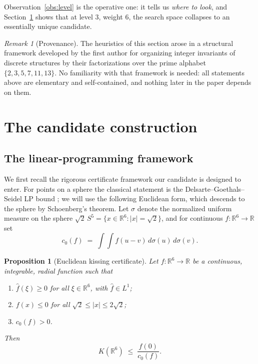 \documentclass[11pt,reqno]{amsart}
\theoremstyle{plain}
\newtheorem{proposition}[theorem]{Proposition}
\theoremstyle{definition}
\theoremstyle{remark}
\newtheorem{remark}[theorem]{Remark}
\newcommand{\R}{\mathbb{R}}
\newcommand{\fhat}[1]{\widehat{#1}}
\begin{document}
Observation~\ref{obs:level} is the operative one: it tells us
\emph{where to look}, and Section~\ref{sec:candidate} shows that at
level $3$, weight $6$, the search space collapses to an essentially
unique candidate.

\begin{remark}[Provenance]\label{rem:provenance}
The heuristics of this section arose in a structural framework
developed by the first author for organizing integer invariants of
discrete structures by their factorizations over the prime alphabet
$\{2,3,5,7,11,13\}$.  No familiarity with that framework is needed:
all statements above are elementary and self-contained, and nothing
later in the paper depends on them.
\end{remark}

\section{The candidate construction}\label{sec:candidate}

\subsection{The linear-programming framework}\label{subsec:LP}

We first recall the rigorous certificate framework our candidate is
designed to enter.  For points on a sphere the classical statement is
the Delsarte--Goethals--Seidel LP bound \cite{DGS1977,KabatianskyLevenshtein1978};
we will use the following Euclidean form, which descends to the sphere
by Schoenberg's theorem.  Let $\sigma$ denote the normalized uniform
measure on the sphere $\sqrt2\,S^5=\{x\in\R^6:|x|=\sqrt2\}$, and for
continuous $f:\R^6\to\R$ set
\[
c_0(f)\;=\;\int\!\!\int f(u-v)\,d\sigma(u)\,d\sigma(v).
\]

\begin{proposition}[Euclidean kissing certificate]\label{prop:certificate}
Let $f:\R^6\to\R$ be a continuous, integrable, radial function such
that
\begin{enumerate}
\item[(i)] $\fhat{f}(\xi)\ge0$ for all $\xi\in\R^6$, with
$\fhat f\in L^1$;
\item[(ii)] $f(x)\le0$ for all $\sqrt2\le|x|\le2\sqrt2$;
\item[(iii)] $c_0(f)>0$.
\end{enumerate}
Then
\[
K(\R^6)\;\le\;\frac{f(0)}{c_0(f)} .
\]
\end{proposition}
\end{document}

